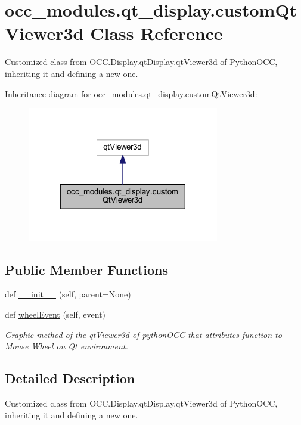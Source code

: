 \hypertarget{a00090}{}\section{occ\+\_\+modules.\+qt\+\_\+display.\+custom\+Qt\+Viewer3d Class Reference}
\label{a00090}


Customized class from O\+C\+C.\+Display.\+qt\+Display.\+qt\+Viewer3d of Python\+O\+CC, inheriting it and defining a new one.  




Inheritance diagram for occ\+\_\+modules.\+qt\+\_\+display.\+custom\+Qt\+Viewer3d\+:\nopagebreak
\begin{figure}[H]
\begin{center}
\leavevmode
\includegraphics[width=237pt]{a00089}
\end{center}
\end{figure}
\subsection*{Public Member Functions}
\begin{DoxyCompactItemize}
\item 
def \hyperlink{a00090_aeef3c40364ac364d1ffc5ba3f5122964}{\+\_\+\+\_\+init\+\_\+\+\_\+} (self, parent=None)
\item 
def \hyperlink{a00090_a2031b7d19b3a0c4b0f54fc90218bcdd8}{wheel\+Event} (self, event)
\begin{DoxyCompactList}\small\item\em Graphic method of the qt\+Viewer3d of python\+O\+CC that attributes function to Mouse Wheel on Qt environment. \end{DoxyCompactList}\end{DoxyCompactItemize}


\subsection{Detailed Description}
Customized class from O\+C\+C.\+Display.\+qt\+Display.\+qt\+Viewer3d of Python\+O\+CC, inheriting it and defining a new one. 

